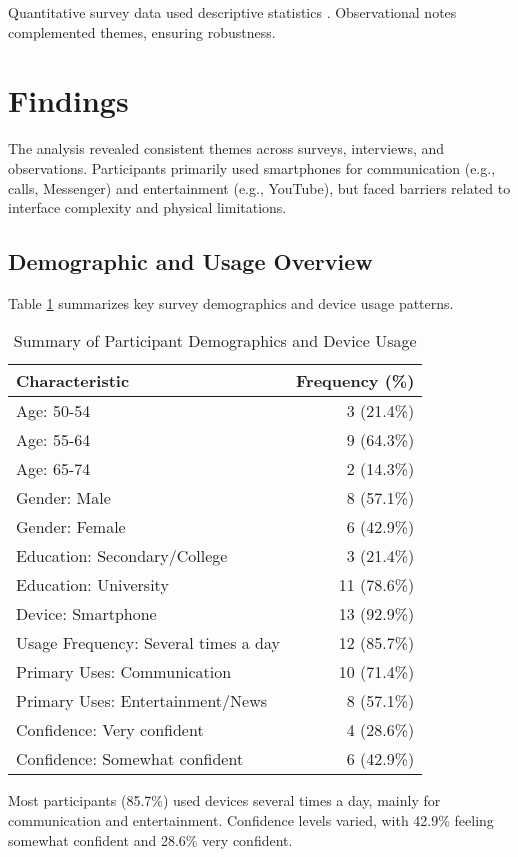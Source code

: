 \documentclass[acmlarge]{acmart}
\begin{document}
Quantitative survey data used descriptive statistics \cite{trochim2020research}. Observational notes complemented themes, ensuring robustness.

\section{Findings}
The analysis revealed consistent themes across surveys, interviews, and observations. Participants primarily used smartphones for communication (e.g., calls, Messenger) and entertainment (e.g., YouTube), but faced barriers related to interface complexity and physical limitations.

\subsection{Demographic and Usage Overview}
Table \ref{tab:demographics} summarizes key survey demographics and device usage patterns.

\begin{table}[h]
\centering
\caption{Summary of Participant Demographics and Device Usage}
\label{tab:demographics}
\begin{tabular}{lr}
\toprule
Characteristic & Frequency (\%) \\
\midrule
Age: 50-54 & 3 (21.4\%) \\
Age: 55-64 & 9 (64.3\%) \\
Age: 65-74 & 2 (14.3\%) \\
Gender: Male & 8 (57.1\%) \\
Gender: Female & 6 (42.9\%) \\
Education: Secondary/College & 3 (21.4\%) \\
Education: University & 11 (78.6\%) \\
Device: Smartphone & 13 (92.9\%) \\
Usage Frequency: Several times a day & 12 (85.7\%) \\
Primary Uses: Communication & 10 (71.4\%) \\
Primary Uses: Entertainment/News & 8 (57.1\%) \\
Confidence: Very confident & 4 (28.6\%) \\
Confidence: Somewhat confident & 6 (42.9\%) \\
\bottomrule
\end{tabular}
\end{table}

Most participants (85.7\%) used devices several times a day, mainly for communication and entertainment. Confidence levels varied, with 42.9\% feeling somewhat confident and 28.6\% very confident.
\end{document}
